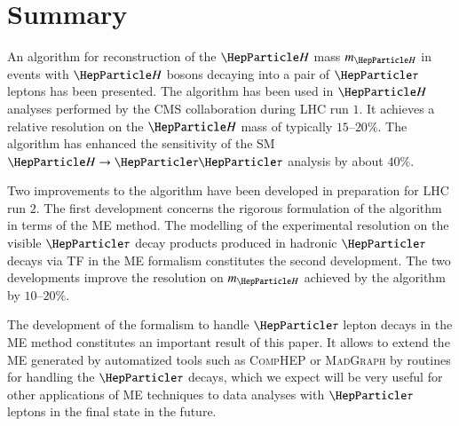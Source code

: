 \section{Summary}
\label{sec:summary}

An algorithm for reconstruction of the $\PHiggs$ mass $m_{\PHiggs}$ in events with
$\PHiggs$ bosons decaying into a pair of $\Pgt$ leptons has been
presented.
The algorithm has been used in $\PHiggs$ analyses performed by the CMS
collaboration during LHC run $1$.
It achieves a relative resolution on the $\PHiggs$ mass of typically
$15$--$20\%$.
The algorithm has enhanced the sensitivity of the SM $\PHiggs \to
\Pgt\Pgt$ analysis by about $40\%$.

Two improvements to the algorithm have been developed in preparation
for LHC run $2$.
The first development concerns the rigorous formulation of the
algorithm in terms of the ME method.
The modelling of the experimental resolution on the visible $\Pgt$
decay products produced in hadronic $\Pgt$ decays via TF in the ME
formalism constitutes the second development.
The two developments improve the resolution on $m_{\PHiggs}$
achieved by the algorithm by $10$--$20\%$.

The development of the formalism to handle $\Pgt$ lepton decays
in the ME method constitutes an important result of this paper.
It allows to extend the ME generated by automatized tools such as
\textsc{CompHEP} or \textsc{MadGraph} by routines for handling the
$\Pgt$ decays, which we expect will be very useful for other
applications of ME techniques to data analyses with $\Pgt$ leptons in
the final state in the future. 